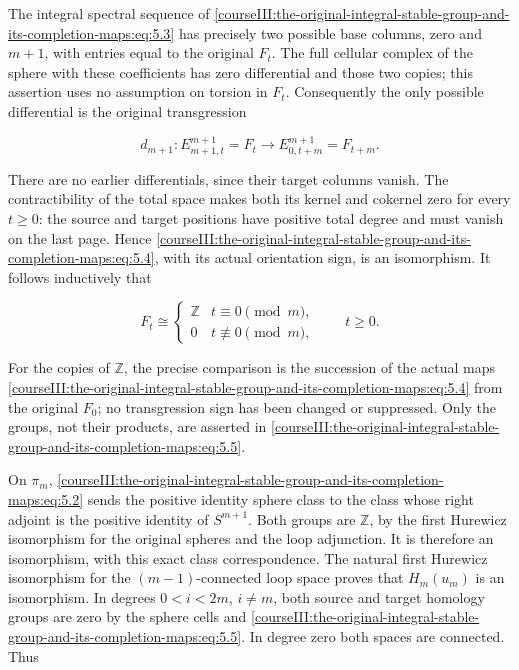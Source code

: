 The integral spectral sequence of \eqref{courseIII:the-original-integral-stable-group-and-its-completion-maps:eq:5.3} has precisely two possible base columns, zero and \(m+1\), with entries equal to the original \(F_t\). The full cellular complex of the sphere with these coefficients has zero differential and those two copies; this assertion uses no assumption on torsion in \(F_t\). Consequently the only possible differential is the original transgression

\begin{equation}
d_{m+1}:E^{m+1}_{m+1,t}=F_t
             \longrightarrow E^{m+1}_{0,t+m}=F_{t+m}.
 \label{courseIII:the-original-integral-stable-group-and-its-completion-maps:eq:5.4}
\end{equation}

There are no earlier differentials, since their target columns vanish. The contractibility of the total space makes both its kernel and cokernel zero for every \(t\geq0\): the source and target positions have positive total degree and must vanish on the last page. Hence \eqref{courseIII:the-original-integral-stable-group-and-its-completion-maps:eq:5.4}, with its actual orientation sign, is an isomorphism. It follows inductively that

\begin{equation}
F_t\cong
 \begin{cases}\mathbb Z&t\equiv0\pmod m,\\0&t\not\equiv0\pmod m,
 \end{cases}\qquad t\geq0.
 \label{courseIII:the-original-integral-stable-group-and-its-completion-maps:eq:5.5}
\end{equation}

For the copies of \(\mathbb Z\), the precise comparison is the succession of the actual maps \eqref{courseIII:the-original-integral-stable-group-and-its-completion-maps:eq:5.4} from the original \(F_0\); no transgression sign has been changed or suppressed. Only the groups, not their products, are asserted in \eqref{courseIII:the-original-integral-stable-group-and-its-completion-maps:eq:5.5}.

On \(\pi_m\), \eqref{courseIII:the-original-integral-stable-group-and-its-completion-maps:eq:5.2} sends the positive identity sphere class to the class whose right adjoint is the positive identity of \(S^{m+1}\). Both groups are \(\mathbb Z\), by the first Hurewicz isomorphism for the original spheres and the loop adjunction. It is therefore an isomorphism, with this exact class correspondence. The natural first Hurewicz isomorphism for the \((m-1)\)-connected loop space proves that \(H_m(u_m)\) is an isomorphism. In degrees \(0<i<2m\), \(i\ne m\), both source and target homology groups are zero by the sphere cells and \eqref{courseIII:the-original-integral-stable-group-and-its-completion-maps:eq:5.5}. In degree zero both spaces are connected. Thus

